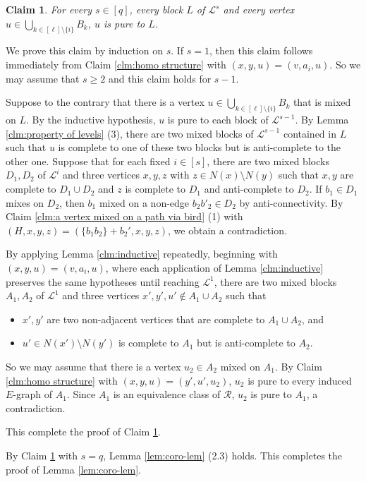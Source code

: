 \documentclass[a4paper,11pt]{article}
\newtheorem{claim}{Claim}[theorem]
\let\oldendproof\endproof
\renewenvironment{proof}[1][\proofname]{%
	\oldproof[\normalfont\bfseries #1]%
}{\oldendproof}
\renewcommand{\qedsymbol}{$\square$}%
\newenvironment{subproof}[1][\normalfont\it Subproof]{%
	\renewcommand{\qedsymbol}{{\tiny{$\blacksquare$}}}%
	\begin{proof}[#1]%
	}{%
	\end{proof}%
}
\begin{document}
\begin{proof}
        \begin{claim}\label{clm:homo blocks}
            For every $s\in[q]$, every block $L$ of $\mathcal{L}^s$ and every vertex $u\in \bigcup_{k\in [\ell]\setminus \{i\}} B_k$, $u$ is pure to $L$.
        \end{claim}
        \begin{subproof}[Proof of Claim \ref{clm:homo blocks}]
            We prove this claim by induction on $s$. 
            If $s=1$, then this claim follows immediately from Claim \ref{clm:homo structure} with $(x,y,u)=(v,a_i,u)$. 
            So we may assume that $s\ge 2$ and this claim holds for $s-1$.

            Suppose to the contrary that there is a vertex $u\in \bigcup_{k\in [\ell]\setminus \{i\}} B_k$ that is mixed on $L$.  
            By the inductive hypothesis, $u$ is pure to each block of $\mathcal{L}^{s-1}$. 
            By Lemma \ref{clm:property of levels} (3), there are two mixed blocks of $\mathcal{L}^{s-1}$ contained in $L$ such that $u$ is complete to one of these two blocks but is anti-complete to the other one. 
            Suppose that for each fixed $i\in [s]$, there are two mixed blocks $D_1,D_2$ of $\mathcal{L}^i$ and three vertices $x,y,z$ with $z\in N(x)\setminus N(y)$ such that $x,y$ are complete to $D_1\cup D_2$ and $z$ is complete to $D_1$ and anti-complete to $D_2$. If $b_1\in D_1$ mixes on $D_2$, then $b_1$ mixed on a non-edge $b_2b'_2\in D_2$ by anti-connectivity. 
            By Claim \ref{clm:a vertex mixed on a path via bird} (1) with $(H,x,y,z)=(\{b_1b_2\}+b_2',x,y,z)$, we obtain a contradiction.

            By applying Lemma \ref{clm:inductive} repeatedly, beginning with $(x,y,u)=(v,a_i,u)$, where each application of Lemma \ref{clm:inductive} preserves the same hypotheses until reaching $\mathcal{L}^1$, there are two mixed blocks $A_1,A_2$ of $\mathcal{L}^1$ and three vertices $x',y',u'\notin A_1\cup A_2$ such that 
            \begin{itemize}
                \item $x',y'$ are two non-adjacent vertices that are complete to $A_1\cup A_2$, and
                \item $u'\in N(x')\setminus N(y')$ is complete to $A_1$ but is anti-complete to $A_2$.  
            \end{itemize}
            
            So we may assume that there is a vertex $u_2\in A_2$ mixed on $A_1$. 
            By Claim \ref{clm:homo structure} with $(x,y,u)=(y',u',u_2)$, $u_2$ is pure to every induced $E$-graph of $A_1$. 
            Since $A_1$ is an equivalence class of $\mathcal{R}$, $u_2$ is pure to $A_1$, a contradiction.  
            
            This complete the proof of Claim \ref{clm:homo blocks}. 
        \end{subproof} 

        By Claim \ref{clm:homo blocks} with $s=q$, Lemma \ref{lem:coro-lem} (2.3) holds.
        This completes the proof of Lemma \ref{lem:coro-lem}. 
    \end{proof}
    
\end{document}
